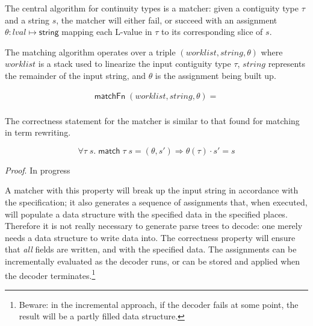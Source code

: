 \documentclass[svgnames]{llncs}
\newcommand{\konst}[1]{\ensuremath{\mathsf{#1}}}
\newcommand{\imp}{\Rightarrow}
\begin{document}
The central algorithm for continuity types is a matcher: given a
contiguity type $\tau$ and a string $s$, the matcher will either fail,
or succeed with an assignment $\theta : \mathit{lval} \mapsto
\konst{string}$ mapping each L-value in $\tau$ to its corresponding
slice of $s$.

\begin{definition}

The matching algorithm operates over a triple $(\mathit{worklist},
\mathit{string}, \theta)$ where $\mathit{worklist}$ is a stack used to
linearize the input contiguity type $\tau$, $\mathit{string}$
represents the remainder of the input string, and $\theta$ is the
assignment being built up.

\[
\begin{array}{l}
\konst{matchFn}\; (\mathit{worklist}, \mathit{string}, \theta) = \\
\end{array}
\]

\end{definition}

The correctness statement for the matcher is similar to that found for
matching in term rewriting.

\begin{theorem}

\[
  \forall \tau\;s.\; \konst{match}\; \tau \; s = (\theta, s') \imp \theta(\tau) \cdot s' = s
\]

\noindent\textit{Proof}. In progress

\end{theorem}

A matcher with this property will break up the input string in
accordance with the specification; it also generates a sequence of
assignments that, when executed, will populate a data structure with
the specified data in the specified places. Therefore it is not really
necessary to generate parse trees to decode: one merely needs a data
structure to write data into. The correctness property will ensure
that \emph{all} fields are written, and with the specified data. The
assignments can be incrementally evaluated as the decoder runs, or can
be stored and applied when the decoder terminates.\footnote{Beware: in
  the incremental approach, if the decoder fails at some point, the
  result will be a partly filled data structure.}

\begin{example}
\end{example}
\end{document}
